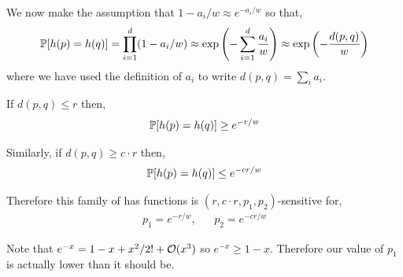 \documentclass[10pt]{article}
\begin{document}
\begin{solution}[Solution]
\begin{enumerate}[label=(\alph*)]
        We now make the assumption that \( 1-a_i/w \approx e^{-a_i/w} \) so that,
        \begin{align*}
            \mathbb{P}[h(p) = h(q)] 
            = \prod_{i=1}^{d} (1-a_i/w)
            \approx \exp \left( -\sum_{i=1}^{d} \frac{a_i}{w} \right)
            \approx \exp \left( -\frac{d(p,q)}{w} \right)
        \end{align*}
        where we have used the definition of \( a_i \) to write \( d(p,q) = \sum_{i}^{}a_i \).

        If \( d(p,q) \leq r \) then,
        \begin{align*}
            \mathbb{P}[h(p) = h(q)] \geq e^{-r/w} 
        \end{align*}
        
        Similarly, if \( d(p,q) \geq c\cdot r \) then,
        \begin{align*}
            \mathbb{P}[h(p) = h(q)] \leq e^{-cr/w} 
        \end{align*}
        
        Therefore this family of has functions is \( (r,c\cdot r,p_1,p_2) \)-sensitive for,
        \begin{align*}
            p_1 = e^{-r/w}, && p_2 = e^{-cr/w}
        \end{align*}

        Note that \( e^{-x} = 1-x+x^2/2! + \mathcal{O}(x^3) \) so \( e^{-x} \geq 1-x \). Therefore our value of \( p_1 \) is actually lower than it should be. 
        

\iffalse
        \begin{align*}
            \PP[h(p) = h(q)]
            = \prod_{i=1}^{d} (1-a_i/w)
            = 1 - \sum_{i=1}^{d} \frac{a_i}{w} + \sum_{i=1}^{d} \sum_{j=i+1}^{d} \frac{a_ia_j}{w^2} + \cdots 
        \end{align*}
\fi 


\end{enumerate}
\end{solution}
\end{document}
